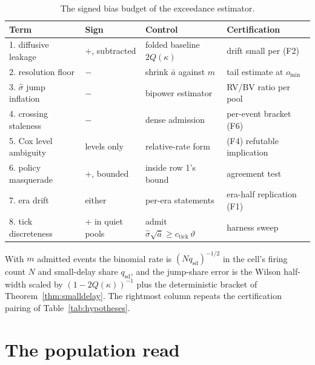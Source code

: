 \documentclass[11pt,a4paper]{article}
\theoremstyle{definition}
\theoremstyle{plain}
\theoremstyle{remark}
\newcommand{\surv}{Q}
\begin{document}
\begin{table}[H]
\centering
\caption{The signed bias budget of the exceedance estimator.}
\label{tab:budget}
{\footnotesize
\begin{tabular}{@{}llll@{}}
\toprule
Term & Sign & Control & Certification \\
\midrule
1. diffusive leakage & $+$, subtracted & folded baseline $2\surv(\kappa)$ & drift small per (F2) \\
2. resolution floor & $-$ & shrink $\bar a$ against $m$ & tail estimate at $o_{\min}$ \\
3. $\hat\sigma$ jump inflation & $-$ & bipower estimator & RV/BV ratio per pool \\
4. crossing staleness & $-$ & dense admission & per-event bracket (F6) \\
5. Cox level ambiguity & levels only & relative-rate form & (F4) refutable implication \\
6. policy masquerade & $+$, bounded & inside row 1's bound & agreement test \\
7. era drift & either & per-era statements & era-half replication (F1) \\
8. tick discreteness & $+$ in quiet pools & admit $\hat\sigma\sqrt{\bar a} \ge c_{\mathrm{tick}}\,\vartheta$ & harness sweep \\
\bottomrule
\end{tabular}}
\end{table}

With $m$ admitted events the binomial rate is $(N
q_{\mathrm{sd}})^{-1/2}$ in the cell's firing count $N$ and
small-delay share $q_{\mathrm{sd}}$, and the jump-share error is the
Wilson half-width scaled by $(1 - 2\surv(\kappa))^{-1}$ plus the
deterministic bracket of Theorem~\ref{thm:smalldelay}. The
rightmost column repeats the certification pairing of
Table~\ref{tab:hypotheses}.


\section{The population read}\label{sec:evidence}
\end{document}
